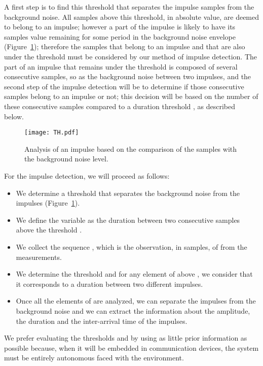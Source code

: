 \documentclass[journal]{IEEEtran}
\begin{document}
A first step is to find this threshold  that separates the impulse samples from the background noise. All samples above this threshold, in absolute value, are deemed to belong to an impulse; however a part of the impulse is likely to have its samples value remaining for some period in the background noise envelope (Figure~\ref{th}); therefore the samples that belong to an impulse and that are also under the threshold  must be considered by our method of impulse detection. The part of an impulse that remains under the threshold  is composed of several consecutive samples, so as the background noise between two impulses, and the second step of the impulse detection will be to determine if those consecutive samples belong to an impulse or not; this decision will be based on the number of these consecutive samples compared to a duration threshold , as described below.\
\begin{figure}
\begin{center}
  \texttt{[image: TH.pdf]}\\
\end{center}
  \caption{Analysis of an impulse based on the comparison of the samples with the background noise level.}\label{th}
\end{figure}

For the impulse detection, we will proceed as follows:
\begin{itemize}
  \item We determine a threshold  that separates the background noise from the impulses (Figure~\ref{th}).
  \item We define the variable  as the duration between two consecutive samples above the threshold .
  \item We collect the sequence , which is the observation, in samples, of  from the measurements.
  \item We determine the threshold  and for any element of  above , we consider that it corresponds to a duration between two different impulses.
  \item Once all the elements of  are analyzed, we can separate the impulses from the background noise and we can extract the information about the amplitude, the duration and the inter-arrival time of the impulses.
\end{itemize}
We prefer evaluating the thresholds  and  by using as little prior information as possible because, when it will be embedded in communication devices, the system must be entirely autonomous faced with the environment.\
\end{document}
